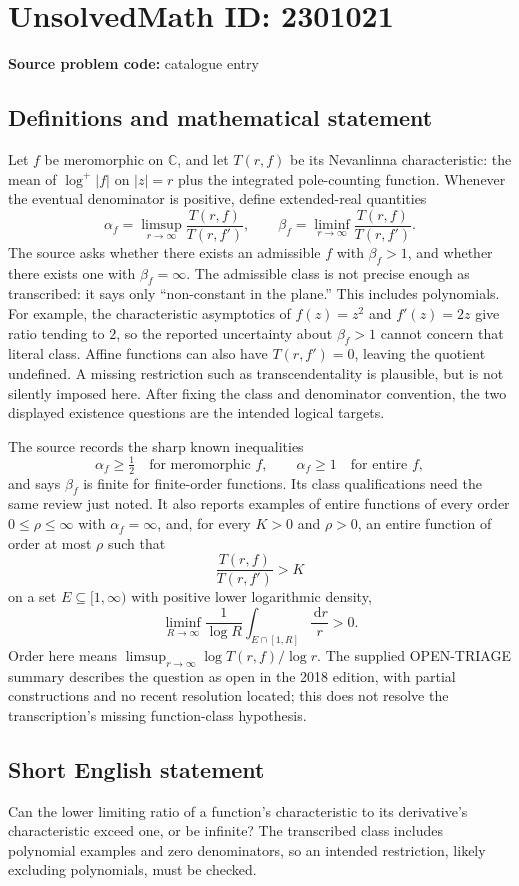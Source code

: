 \documentclass[11pt]{article}
\newcommand{\C}{\mathbb{C}}
\newcommand{\dd}{\,\mathrm{d}}
\begin{document}
\section*{UnsolvedMath ID: 2301021}
\textbf{Source problem code:} catalogue entry
\subsection{Definitions and mathematical statement}
Let \(f\) be meromorphic on \(\C\), and let \(T(r,f)\) be its Nevanlinna characteristic: the mean of \(\log^+|f|\) on \(|z|=r\) plus the integrated pole-counting function. Whenever the eventual denominator is positive, define extended-real quantities
\[
\alpha_f=\limsup_{r\to\infty}\frac{T(r,f)}{T(r,f')},\qquad
\beta_f=\liminf_{r\to\infty}\frac{T(r,f)}{T(r,f')}.
\]
The source asks whether there exists an admissible \(f\) with \(\beta_f>1\), and whether there exists one with \(\beta_f=\infty\). The admissible class is not precise enough as transcribed: it says only ``non-constant in the plane.'' This includes polynomials. For example, the characteristic asymptotics of \(f(z)=z^2\) and \(f'(z)=2z\) give ratio tending to \(2\), so the reported uncertainty about \(\beta_f>1\) cannot concern that literal class. Affine functions can also have \(T(r,f')=0\), leaving the quotient undefined. A missing restriction such as transcendentality is plausible, but is not silently imposed here. After fixing the class and denominator convention, the two displayed existence questions are the intended logical targets.

The source records the sharp known inequalities
\[
\alpha_f\ge\tfrac12\quad\text{for meromorphic }f,
\qquad \alpha_f\ge1\quad\text{for entire }f,
\]
and says \(\beta_f\) is finite for finite-order functions. Its class qualifications need the same review just noted. It also reports examples of entire functions of every order \(0\le\rho\le\infty\) with \(\alpha_f=\infty\), and, for every \(K>0\) and \(\rho>0\), an entire function of order at most \(\rho\) such that
\[
\frac{T(r,f)}{T(r,f')}>K
\]
on a set \(E\subseteq[1,\infty)\) with positive lower logarithmic density,
\[
\liminf_{R\to\infty}\frac1{\log R}\int_{E\cap[1,R]}\frac{\dd r}{r}>0.
\]
Order here means \(\limsup_{r\to\infty}\log T(r,f)/\log r\). The supplied OPEN-TRIAGE summary describes the question as open in the 2018 edition, with partial constructions and no recent resolution located; this does not resolve the transcription's missing function-class hypothesis.
\subsection{Short English statement}
Can the lower limiting ratio of a function's characteristic to its derivative's characteristic exceed one, or be infinite? The transcribed class includes polynomial examples and zero denominators, so an intended restriction, likely excluding polynomials, must be checked.
\end{document}
